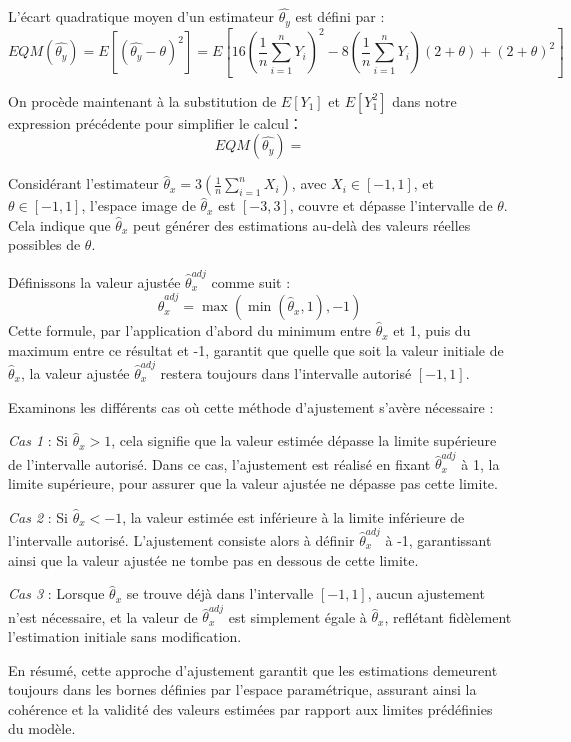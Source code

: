 \documentclass[../main.tex]{subfiles}
\begin{document}
\begin{CJK*}{UTF8}{gbsn}
L'écart quadratique moyen  d'un estimateur $\hat{\theta_y}$ est défini par :
\begin{equation*}
EQM(\hat{\theta_y}) = E[(\hat{\theta_y} - \theta)^2] = E\left[16\left(\frac{1}{n}\sum_{i=1}^{n} Y_i\right)^2 - 8\left(\frac{1}{n}\sum_{i=1}^{n} Y_i\right)(2 + \theta) + (2 + \theta)^2\right]
\end{equation*}

On procède maintenant à la substitution de $E[Y_1]$ et $E[Y_1^2]$ dans notre expression précédente pour simplifier
le calcul：
\begin{equation*}
EQM(\hat{\theta_y}) = 
\end{equation*}

Considérant l'estimateur \(\hat{\theta}_x = 3\left(\frac{1}{n}\sum_{i=1}^{n}X_i\right)\), avec \(X_i \in [-1, 1]\), 
et \( \theta \in [-1, 1] \), 
l'espace image de $\hat{\theta}_x$ est $[-3, 3]$, 
couvre et dépasse l'intervalle de $\theta$. 
Cela indique que $\hat{\theta}_x$ peut générer des estimations 
au-delà des valeurs réelles possibles de $\theta$.

Définissons la valeur ajustée $\hat{\theta}_{x}^{adj} $ comme suit :
\begin{equation*}
\hat{\theta}_{x}^{adj} = \max(\min(\hat{\theta}_x, 1), -1)
\end{equation*}
Cette formule, par l'application d'abord du minimum entre $ \hat{\theta}_x $ et 1, 
puis du maximum entre ce résultat et -1, 
garantit que quelle que soit la valeur initiale de $ \hat{\theta}_x $, 
la valeur ajustée $\hat{\theta}_{x}^{adj} $ restera toujours dans l'intervalle autorisé $[-1, 1] $.

Examinons les différents cas où cette méthode d'ajustement s'avère nécessaire :

\textit{Cas 1} : Si $ \hat{\theta}_x > 1 $, 
cela signifie que la valeur estimée dépasse la limite supérieure de l'intervalle autorisé. Dans ce cas, 
l'ajustement est réalisé en fixant $ \hat{\theta}_{x}^{adj} $ à 1, la limite supérieure, 
pour assurer que la valeur ajustée ne dépasse pas cette limite.

\textit{Cas 2} : Si $ \hat{\theta}_x < -1 $, la valeur estimée est inférieure à la limite inférieure de l'intervalle autorisé.
L'ajustement consiste alors à définir $ \hat{\theta}_{x}^{adj} $ à -1, 
garantissant ainsi que la valeur ajustée ne tombe pas en dessous de cette limite.

\textit{Cas 3} : Lorsque $ \hat{\theta}_x $ se trouve déjà dans l'intervalle $[-1, 1]$, 
aucun ajustement n'est nécessaire, et la valeur de \( \hat{\theta}_{x}^{adj} \) est simplement égale à $\hat{\theta}_x$, 
reflétant fidèlement l'estimation initiale sans modification.

En résumé, cette approche d'ajustement garantit que les estimations demeurent toujours dans les bornes définies par l'espace paramétrique,
assurant ainsi la cohérence et la validité des valeurs estimées par rapport aux limites prédéfinies du modèle.



\end{CJK*}
\end{document}
